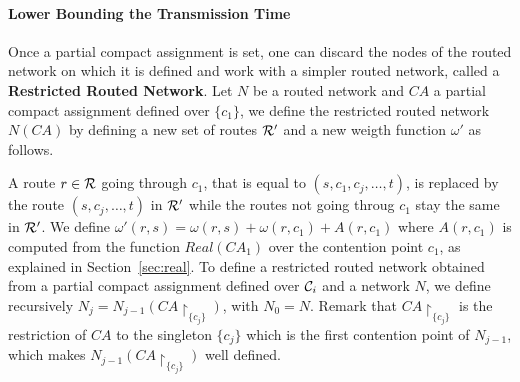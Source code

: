 \paragraph{Lower Bounding the Transmission Time}


Once a partial compact assignment is set, one can discard the nodes of the routed network on which it is defined
and work with a simpler routed network, called a \textbf{Restricted Routed Network}. Let $N$ be a routed network
and $CA$ a partial compact assignment defined over $\{c_1\}$, we define the restricted routed network $N(CA)$ by defining a new set of routes ${\cal R}'$ and a new weigth function $\omega'$ as follows. 


A route $r \in {\cal R}$ going through $c_1$, that is equal to $(s,c_1,c_j,\ldots,t)$,  is replaced by the route $(s,c_j,\ldots,t)$ in ${\cal R}'$ while the routes not going throug $c_1$ stay the same in ${\cal R}'$. We define $\omega'(r,s) = \omega(r,s)+\omega(r,c_1) + A(r,c_1)$ where $A(r,c_1)$ is computed from the function $Real(CA_1)$ over the contention point $c_1$, as explained in Section~\ref{sec:real}. To define a restricted routed network obtained from a partial compact assignment defined over ${\cal C}_i$ and a network $N$, we define recursively $N_j = N_{j-1}(CA\restriction_{\{c_j\}})$, with $N_0 = N$. Remark that $CA\restriction_{\{c_j\}}$ is the restriction of $CA$ to the singleton $\{c_j\}$ which is the first contention point of $N_{j-1}$, which makes $N_{j-1}(CA\restriction_{\{c_j\}})$ well defined.


